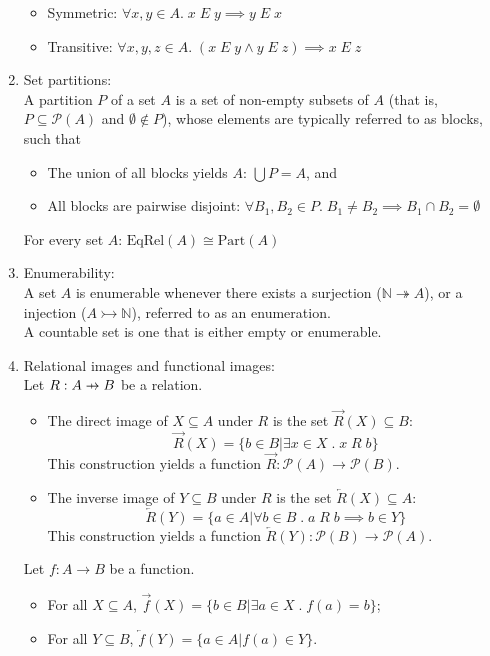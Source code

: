 \documentclass{article}
\newcommand\pfun{\mathrel{\ooalign{\hfil$\mapstochar\mkern5mu$\hfil\cr$\to$\cr}}}
\begin{document}
\begin{enumerate}
\begin{itemize}[topsep=0pt]
            \item Symmetric: $\forall x, y\in A.\; x\;E\;y\implies y\;E\;x$
            \item Transitive: $\forall x, y, z\in A.\;(x\;E\;y\wedge y\;E\;z)\implies x\;E\;z$
        \end{itemize}
    \item Set partitions:\\
        A partition $P$ of a set $A$ is a set of non-empty subsets of $A$ (that is, $P\subseteq\mathcal{P}(A)$ and $\emptyset\notin P$), whose elements are typically referred to as blocks, such that
        \begin{itemize}[topsep=0pt]
            \item The union of all blocks yields $A$: $\bigcup P=A$, and
            \item All blocks are pairwise disjoint: $\forall B_1, B_2\in P.\;B_1\neq B_2\implies B_1\cap B_2=\emptyset$
        \end{itemize}
        For every set $A$: $\text{EqRel}(A)\cong\text{Part}(A)$
    \item Enumerability:\\
        A set $A$ is enumerable whenever there exists a surjection ($\mathbb{N}\twoheadrightarrow A$), or a injection ($A\rightarrowtail\mathbb{N}$), referred to as an enumeration.\\
        A countable set is one that is either empty or enumerable.
    \item Relational images and functional images:\\
        Let $R:A\pfun B$ be a relation.
        \begin{itemize}[topsep=0pt]
            \item The direct image of $X\subseteq A$ under $R$ is the set $\overrightarrow{R}(X)\subseteq B$:
                $$\overrightarrow{R}(X)=\{b\in B|\exists x\in X\;.\;x\;R\;b\}$$
                This construction yields a function $\overrightarrow{R}:\mathcal{P}(A)\to\mathcal{P}(B)$.
            \item The inverse image of $Y\subseteq B$ under $R$ is the set $\overleftarrow{R}(X)\subseteq A$:
                $$\overleftarrow{R}(Y)=\{a\in A|\forall b\in B\;.\;a\;R\;b\implies b\in Y\}$$
                This construction yields a function $\overleftarrow{R}(Y):\mathcal{P}(B)\to\mathcal{P}(A)$.
        \end{itemize}
        Let $f:A\to B$ be a function.
        \begin{itemize}[topsep=0pt]
            \item For all $X\subseteq A$, $\overrightarrow{f}(X)=\{b\in B|\exists a\in X\;.\;f(a)=b\}$;
            \item For all $Y\subseteq B$, $\overleftarrow{f}(Y)=\{a\in A|f(a)\in Y\}$.
        \end{itemize}
\end{enumerate}
\end{document}
